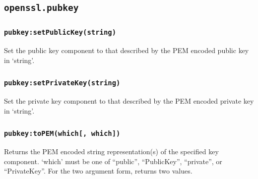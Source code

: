 \documentclass[11pt, oneside]{memoir}
\newcommand*{\fn}[1]{\texttt{#1}\xspace}
\newcounter{toccols}
\newenvironment{Module}[1]{
	\subsection{\texttt{#1}}
	\addtocontents{toc}{
		\protect\begin{multicols}{\value{toccols}}
	}
}{
	\addtocontents{toc}{\protect\end{multicols}}
}
\begin{document}
\begin{Module}{openssl.pubkey}
\subsubsection[\fn{pubkey:setPublicKey}]{\fn{pubkey:setPublicKey(string)}}

Set the public key component to that described by the PEM encoded public key in `string'.

\subsubsection[\fn{pubkey:setPrivateKey}]{\fn{pubkey:setPrivateKey(string)}}

Set the private key component to that described by the PEM encoded private key in `string'.

\subsubsection[\fn{pubkey:toPEM}]{\fn{pubkey:toPEM(which[, which])}}

Returns the PEM encoded string representation(s) of the specified key component. `which' must be one of ``public'', ``PublicKey'', ``private'', or ``PrivateKey''. For the two argument form, returns two values.

\end{Module}
\end{document}
